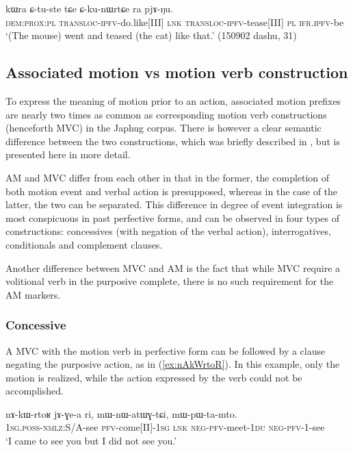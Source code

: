 \begin{exe}
\ex \label{ex:CkunWrtCe}
\gll  kɯra ɕ-tu-ste tɕe ɕ-ku-nɯrtɕe ra pjɤ-ŋu. \\
\textsc{dem}:\textsc{prox}:\textsc{pl} \textsc{transloc}-\textsc{ipfv}-do.like[III] \textsc{lnk}  \textsc{transloc}-\textsc{ipfv}-tease[III] \textsc{pl} \textsc{ifr}.\textsc{ipfv}-be \\
\glt `(The mouse) went and teased (the cat) like that.' (150902 dashu, 31)
\end{exe}

\subsection{Associated motion vs motion verb construction} \label{sec:am.vs.mvc}
To express the meaning of motion prior to an action, associated motion prefixes are nearly two times as common as corresponding motion verb constructions (henceforth MVC) in the Japhug corpus. There is however a clear semantic difference between the two constructions, which was briefly described in \citet{jacques13harmonization}, but is presented here in more detail.

AM and MVC differ from each other in that in the former, the completion of both motion event and verbal action is presupposed, whereas in the case of the latter, the two can be separated. This difference in degree of event integration is most conspicuous in past perfective forms, and can be observed in four types of constructions: concessives (with negation of the verbal action), interrogatives, conditionals and complement clauses. 

Another difference between MVC and AM is the fact that while MVC require a volitional verb in the purposive complete, there is no such requirement for the AM markers.

\subsubsection{Concessive} \label{sec:am.concessive}
A MVC  with the motion verb in perfective form can be followed by a clause negating the purposive action, as in (\ref{ex:nAkWrtoR}). In this example, only the motion is realized, while the action expressed by the verb  could not be accomplished.

\begin{exe}
\ex \label{ex:nAkWrtoR}
\gll nɤ-kɯ-rtoʁ jɤ-ɣe-a ri, mɯ-nɯ-atɯɣ-tɕi, mɯ-pɯ-ta-mto. \\
\textsc{1sg.poss}-\textsc{nmlz}:S/A-see \textsc{pfv}-come[II]-\textsc{1sg} \textsc{lnk} \textsc{neg}-\textsc{pfv}-meet-\textsc{1du} \textsc{neg}-\textsc{pfv}-1-see \\
\glt `I came to see you but I did not see you.' 
\end{exe}


